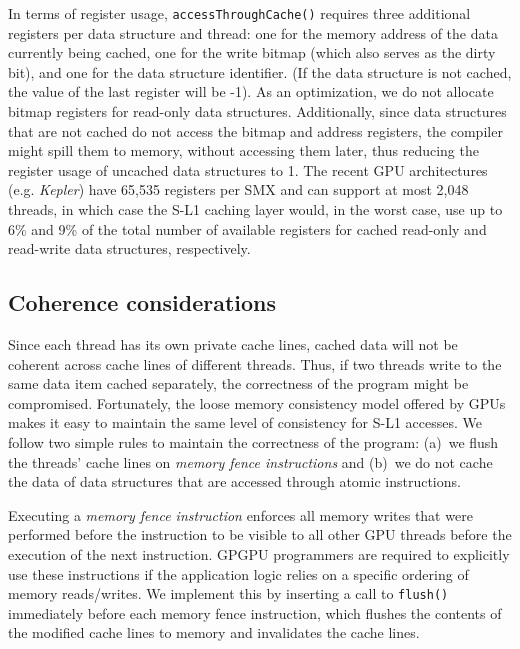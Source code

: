 In terms of register usage, \texttt{accessThroughCache()} requires three additional registers per
data structure and thread: one for the memory address of the data currently being cached, one for
the write bitmap (which also serves as the dirty bit), and one for the data structure identifier.
(If the data structure is not cached, the value of the last register will be -1). 
As an optimization, we do not allocate bitmap registers for read-only data structures. Additionally,
since data structures that are not cached do not access the bitmap and address registers, the
compiler might spill them to memory, without accessing them later, thus reducing the register usage
of uncached data structures to 1.
The recent GPU architectures (e.g. {\it Kepler}) have 65,535 registers per SMX and can support at
most 2,048 threads, in which case the S-L1 caching layer would, in the worst case, use up to 6\% and 9\% of the total
number of available registers for cached read-only and read-write data structures, respectively. 

\subsection{Coherence considerations}

Since each thread has its own private cache lines, cached data will not be coherent across
cache lines of different threads. 
Thus, if two threads write to the same data item cached separately, the correctness of the program
might be compromised.
Fortunately, the loose memory consistency model offered by GPUs makes it easy to maintain the same level of consistency for S-L1 accesses.
We follow two simple rules to maintain the correctness of the program:
(a)~we flush the threads' cache lines on {\it memory fence instructions} and (b)~we do not cache the data of data
structures that are accessed through atomic instructions.

Executing a {\it memory fence instruction} enforces all memory writes that were performed before the
instruction to be visible to all other GPU threads before the execution of the next instruction. 
GPGPU programmers are required to explicitly use these instructions if the application logic relies
on a specific ordering of memory reads/writes. 
We implement this by inserting a call to \texttt{flush()} immediately before each memory fence
instruction, which flushes the contents of the modified cache lines to memory
and invalidates the cache lines.

